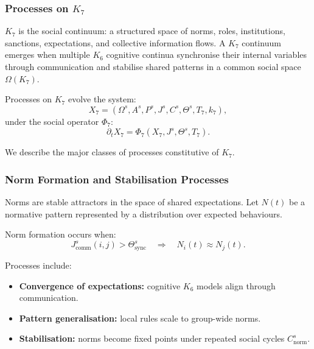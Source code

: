 

\subsubsection{Processes on \texorpdfstring{$K_7$}{K_7}}
\label{sec:processes-k7}

$K_7$ is the social continuum: a structured space of norms, roles, 
institutions, sanctions, expectations, and collective information flows.
A $K_7$ continuum emerges when multiple $K_6$ cognitive continua 
synchronise their internal variables through communication and 
stabilise shared patterns in a common social space $\Omega(K_7)$.

Processes on $K_7$ evolve the system:
\[
X_7 = (\Omega^s, A^s, P^s, J^s, C^s, \Theta^s, T_7, k_7),
\]
under the social operator $\Phi_7$:
\[
\partial_t X_7 = \Phi_7(X_7, J^s, \Theta^s, T_7).
\]

We describe the major classes of processes constitutive of $K_7$.

\subsubsection{Norm Formation and Stabilisation Processes}

Norms are stable attractors in the space of shared expectations.
Let $N(t)$ be a normative pattern represented by a distribution over 
expected behaviours.

Norm formation occurs when:
\[
J^s_{\text{comm}}(i,j) > \Theta^s_{\text{sync}}
\quad\Rightarrow\quad
N_i(t) \approx N_j(t).
\]

Processes include:
\begin{itemize}
    \item \textbf{Convergence of expectations:}  
    cognitive $K_6$ models align through communication.
    \item \textbf{Pattern generalisation:}  
    local rules scale to group-wide norms.
    \item \textbf{Stabilisation:}  
    norms become fixed points under repeated social cycles $C^s_{\text{norm}}$.
\end{itemize}

